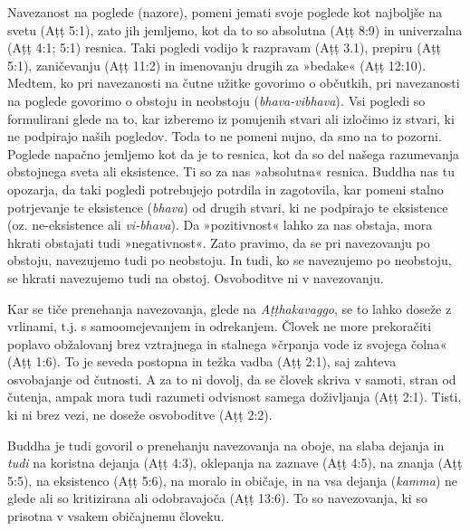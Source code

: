 Navezanost na poglede (nazore), pomeni jemati svoje poglede kot
najboljše na svetu (Aṭṭ 5:1), zato jih jemljemo, kot da to so absolutna
(Aṭṭ 8:9) in univerzalna (Aṭṭ 4:1; 5:1) resnica. Taki pogledi vodijo k
razpravam (Aṭṭ 3.1), prepiru (Aṭṭ 5:1), zaničevanju (Aṭṭ 11:2) in
imenovanju drugih za »bedake« (Aṭṭ 12:10). Medtem, ko pri navezanosti na
čutne užitke govorimo o občutkih, pri navezanosti na poglede govorimo o
obstoju in neobstoju (\emph{bhava-vibhava})\emph{.} Vsi pogledi so
formulirani glede na to, kar izberemo iz ponujenih stvari ali izločimo
iz stvari, ki ne podpirajo naših pogledov. Toda to ne pomeni nujno, da
smo na to pozorni. Poglede napačno jemljemo kot da je to resnica, kot da
so del našega razumevanja obstojnega sveta ali eksistence. Ti so za nas
»absolutna« resnica. Buddha nas tu opozarja, da taki pogledi potrebujejo
potrdila in zagotovila, kar pomeni stalno potrjevanje te eksistence
(\emph{bhava}) od drugih stvari, ki ne podpirajo te eksistence (oz.
ne-eksistence ali \emph{vi-bhava}). Da »pozitivnost« lahko za nas
obstaja, mora hkrati obstajati tudi »negativnost«. Zato pravimo, da se
pri navezovanju po obstoju, navezujemo tudi po neobstoju. In tudi, ko se
navezujemo po neobstoju, se hkrati navezujemo tudi na obstoj.
Osvoboditve ni v navezovanju.

Kar se tiče prenehanja navezovanja, glede na \emph{Aṭṭhakavaggo}, se
to lahko doseže z vrlinami, t.j. s samoomejevanjem in odrekanjem. Človek
ne more prekoračiti poplavo obžalovanj brez vztrajnega in stalnega
»črpanja vode iz svojega čolna« (Aṭṭ 1:6). To je seveda postopna in
težka vadba (Aṭṭ 2:1), saj zahteva osvobajanje od čutnosti. A za to ni
dovolj, da se človek skriva v samoti, stran od čutenja, ampak mora tudi
razumeti odvisnost samega doživljanja (Aṭṭ 2:1). Tisti, ki ni brez vezi,
ne doseže osvoboditve (Aṭṭ 2:2).

Buddha je tudi govoril o prenehanju navezovanja na oboje, na slaba
dejanja in \emph{tudi} na koristna dejanja (Aṭṭ 4:3), oklepanja na
zaznave (Aṭṭ 4:5), na znanja (Aṭṭ 5:5), na eksistenco (Aṭṭ 5:6), na
moralo in običaje, in na vsa dejanja (\emph{kamma}) ne glede ali so
kritizirana ali odobravajoča (Aṭṭ 13:6). To so navezovanja, ki so
prisotna v vsakem običajnemu človeku.

